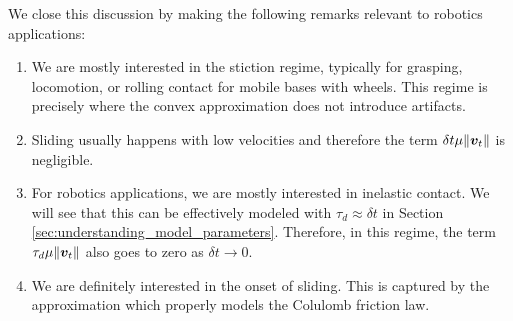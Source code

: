 We close this discussion by making the following remarks relevant to robotics
applications:
\begin{enumerate}
	\item We are mostly interested in the stiction regime, typically for
	grasping, locomotion, or rolling contact for mobile bases with wheels. This
	regime is precisely where the convex approximation does not introduce
	artifacts.
	\item Sliding usually happens with low velocities and therefore the term
	$\delta t\mu\Vert{\bm{v}}_t\Vert$ is negligible.
	\item For robotics applications, we are mostly interested in inelastic
	contact. We will see that this can be effectively modeled with
	$\tau_d\approx\delta t$ in Section \ref{sec:understanding_model_parameters}.
	Therefore, in this regime, the term $\tau_d\mu\Vert{\bm{v}}_t\Vert$ also goes
	to zero as $\delta t\rightarrow 0$.
	\item We are definitely interested in the onset of sliding. This is captured
	by the approximation which properly models the Colulomb friction law.
\end{enumerate}

